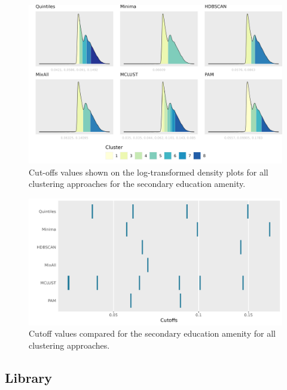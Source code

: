 \documentclass[11pt, a4paper]{article}
\begin{document}
\begin{figure}[H]
\centering
\includegraphics[width=\textwidth]{./cutoffs/by_amenity/Secondary Education_cutoffs.png}
\caption[Secondary education cutoffs]{Cut-offs values shown on the log-transformed density plots for all clustering approaches for the secondary education amenity.}\label{seceduccutoffs}
\end{figure}





\begin{figure}[H]
\centering
\includegraphics[width=\textwidth]{./cutoff_ticks/Secondary Education_ticks.png}
\caption[Secondary Education cutoff comparison]{Cutoff values compared for the secondary education amenity for all clustering approaches.}\label{seceducticks}
\end{figure}









\pagebreak
\justifying
\subsection{Library}
\end{document}
